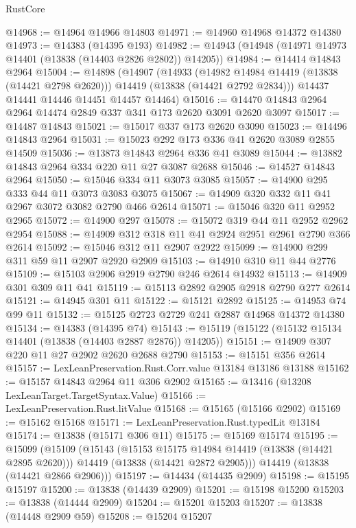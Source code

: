 \begin{lexlean}{RustCore}
\begin{coremodule}
@14968 := @14964 @14966 @14803
@14971 := @14960 @14968 @14372 @14380
@14973 := @14383 (@14395 @193)
@14982 := @14943 (@14948 (@14971 @14973 @14401 (@13838 (@14403 @2826 @2802)) @14205))
@14984 := @14414 @14843 @2964
@15004 := @14898
    (@14907
      (@14933
        (@14982 @14984 @14419 (@13838 (@14421 @2798 @2620)))
        @14419
        (@13838 (@14421 @2792 @2834)))
      @14437
      @14441
      @14446
      @14451
      @14457
      @14464)
@15016 := @14470 @14843 @2964 @2964 @14474 @2849 @337 @341 @173 @2620 @3091 @2620 @3097
@15017 := @14487 @14843
@15021 := @15017 @337 @173 @2620 @3090
@15023 := @14496 @14843 @2964
@15031 := @15023 @292 @173 @336 @41 @2620 @3089 @2855 @14509
@15036 := @13873 @14843 @2964 @336 @41 @3089
@15044 := @13882 @14843 @2964 @334 @220 @11 @27 @3087 @2688
@15046 := @14527 @14843 @2964
@15050 := @15046 @334 @11 @3073 @3085
@15057 := @14900 @295 @333 @44 @11 @3073 @3083 @3075
@15067 := @14909 @320 @332 @11 @41 @2967 @3072 @3082 @2790 @466 @2614
@15071 := @15046 @320 @11 @2952 @2965
@15072 := @14900 @297
@15078 := @15072 @319 @44 @11 @2952 @2962 @2954
@15088 := @14909 @312 @318 @11 @41 @2924 @2951 @2961 @2790 @366 @2614
@15092 := @15046 @312 @11 @2907 @2922
@15099 := @14900 @299 @311 @59 @11 @2907 @2920 @2909
@15103 := @14910 @310 @11 @44 @2776
@15109 := @15103 @2906 @2919 @2790 @246 @2614 @14932
@15113 := @14909 @301 @309 @11 @41
@15119 := @15113 @2892 @2905 @2918 @2790 @277 @2614
@15121 := @14945 @301 @11
@15122 := @15121 @2892
@15125 := @14953 @74 @99 @11
@15132 := @15125 @2723 @2729 @241 @2887 @14968 @14372 @14380
@15134 := @14383 (@14395 @74)
@15143 := @15119 (@15122 (@15132 @15134 @14401 (@13838 (@14403 @2887 @2876)) @14205))
@15151 := @14909 @307 @220 @11 @27 @2902 @2620 @2688 @2790
@15153 := @15151 @356 @2614
@15157 := LexLeanPreservation.Rust.Corr.value @13184 @13186 @13188
@15162 := @15157 @14843 @2964 @11 @306 @2902
@15165 := @13416 (@13208 LexLeanTarget.TargetSyntax.Value)
@15166 := LexLeanPreservation.Rust.litValue
@15168 := @15165 (@15166 @2902)
@15169 := @15162 @15168
@15171 := LexLeanPreservation.Rust.typedLit @13184
@15174 := @13838 (@15171 @306 @11)
@15175 := @15169 @15174
@15195 := @15099
    (@15109
      (@15143
        (@15153 @15175 @14984 @14419 (@13838 (@14421 @2895 @2620)))
        @14419
        (@13838 (@14421 @2872 @2905)))
      @14419
      (@13838 (@14421 @2866 @2906)))
@15197 := @14434 (@14435 @2909)
@15198 := @15195 @15197
@15200 := @13838 (@14439 @2909)
@15201 := @15198 @15200
@15203 := @13838 (@14444 @2909)
@15204 := @15201 @15203
@15207 := @13838 (@14448 @2909 @59)
@15208 := @15204 @15207

\end{coremodule}
\end{lexlean}
